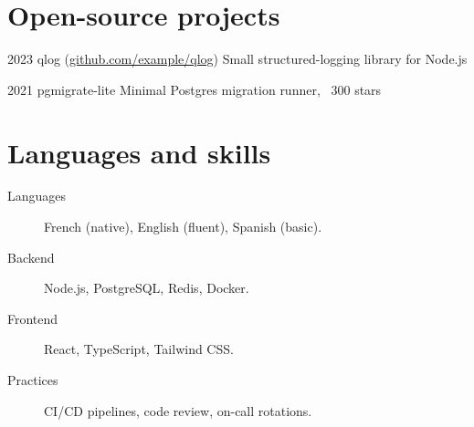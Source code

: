 \documentclass[fontsize=10pt]{tccv}
\begin{document}
\section{Open-source projects}

\begin{yearlist}

\item{2023}
     {qlog (\href{https://github.com/example/qlog}{github.com/example/qlog})}
     {Small structured-logging library for Node.js}

\item{2021}
     {pgmigrate-lite}
     {Minimal Postgres migration runner, ~300 stars}

\end{yearlist}

\section{Languages and skills}

\begin{description}
\item[Languages] French (native), English (fluent), Spanish (basic).
\item[Backend] Node.js, PostgreSQL, Redis, Docker.
\item[Frontend] React, TypeScript, Tailwind CSS.
\item[Practices] CI/CD pipelines, code review, on-call rotations.
\end{description}
\end{document}
